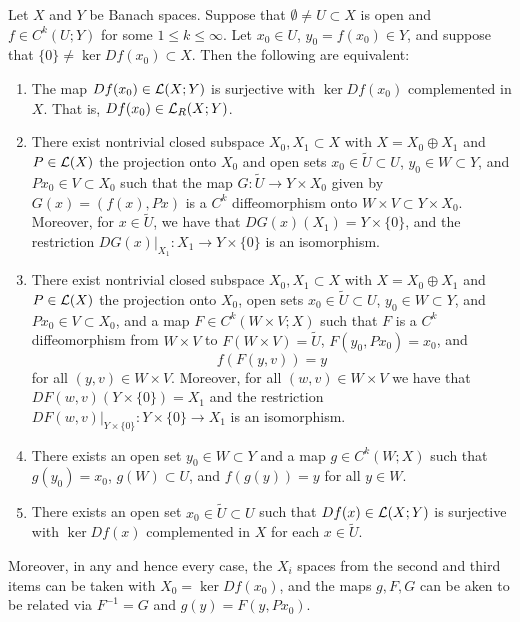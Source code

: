 \documentclass[a4paper]{article}
\begin{document}
\begin{thm}
  Let $X$ and $Y$ be Banach spaces. Suppose that $\emptyset
    \neq U \subset X$ is open and $f \in C^k (U ; Y)$ for
  some $1 \leq k \leq \infty$. Let $x_0 \in U$,
  $y_0 = f(x_0) \in Y$, and suppose that $\{0\} \neq
    \ker Df(x_0) \subset X$. Then the following
  are equivalent:

  \begin{enumerate}
    \item The map $Df(x_0) \in \mathcal{L}(X; Y)$ is surjective with $\ker Df(x_0)$
          complemented in $X$. That is, $Df(x_0) \in \mathcal{L}_R(X; Y)$.

    \item There exist nontrivial closed subspace $X_0, X_1 \subset X$ with
          $X = X_0 \oplus X_1$ and $P \in \mathcal{L}(X)$ the projection onto $X_0$
          and open sets $x_0 \in \tilde{U} \subset U$, $y_0 \in W \subset
          Y$, and $Px_0 \in V \subset X_0$ such that the map $G :
          \tilde{U} \to Y \times X_0$ given by $G(x) = (f(x), Px)$ is a
          $C^k$ diffeomorphism onto $W \times V \subset Y \times X_0$.
          Moreover, for $x \in \tilde{U}$, we have that $DG(x) (X_1) = Y
          \times \{0\}$, and the restriction $DG(x) \vert_{X_1} : X_1 \to
          Y \times \{0\}$ is an isomorphism.

    \item There exist nontrivial closed subspace $X_0, X_1 \subset X$ with
          $X = X_0 \oplus X_1$ and $P \in \mathcal{L}(X)$ the projection onto
          $X_0$, open sets $x_0 \in \tilde{U} \subset U$, $y_0 \in W
          \subset Y$, and $P x_0 \in V \subset X_0$, and a map $F \in C^k
          (W \times V ; X)$ such that $F$ is a $C^k$ diffeomorphism from
          $W \times V$ to $F(W \times V) = \tilde{U}$, $F(y_0, Px_0) =
          x_0$, and
          \[
            f(F(y, v)) = y
          \]
          for all $(y, v) \in W \times V$. Moreover, for all $(w, v) \in W
          \times V$ we have that $DF(w, v) (Y \times \{0\}) = X_1$ and the
          restriction $DF(w, v) \vert_{Y \times \{0\}} : Y \times \{0\}
          \to X_1$ is an isomorphism.

    \item There exists an open set $y_0 \in W \subset Y$ and a map $g \in
          C^k(W; X)$ such that $g(y_0) = x_0$, $g(W) \subset U$, and
          $f(g(y)) = y$ for all $y \in W$.

    \item There exists an open set $x_0 \in \tilde{U} \subset U$ such that
          $Df(x) \in \mathcal{L}(X; Y)$ is surjective with $\ker Df(x)$
          complemented in $X$ for each $x \in \tilde{U}$.
  \end{enumerate}
  Moreover, in any and hence every case, the $X_i$ spaces
  from the second and third items can be taken with $X_0
    = \ker Df(x_0)$, and the maps $g, F, G$ can be aken to be
  related via $F^{-1} = G$ and $g(y) = F(y, P x_0)$.
\end{thm}
\end{document}
